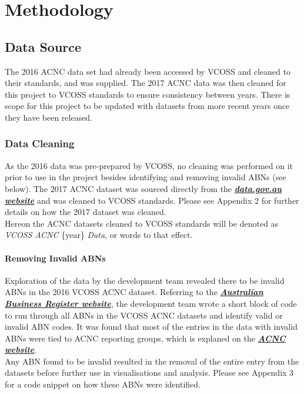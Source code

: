\documentclass[
  11pt,
]{article}
\begin{document}
\newpage

\hypertarget{methodology}{%
\section{Methodology}\label{methodology}}

\hypertarget{data-source}{%
\subsection{Data Source}\label{data-source}}

The 2016 ACNC data set had already been accessed by VCOSS and cleaned to their standards, and was supplied. The 2017 ACNC data was then cleaned for this project to VCOSS standards to ensure consistency between years. There is scope for this project to be updated with datasets from more recent years once they have been released.

\hypertarget{data-cleaning}{%
\subsubsection{Data Cleaning}\label{data-cleaning}}

As the 2016 data was pre-prepared by VCOSS, no cleaning was performed on it prior to use in the project besides identifying and removing invalid ABNs (see below). The 2017 ACNC dataset was sourced directly from the \href{https://data.gov.au/dataset/ds-dga-a1f8626c-fefb-4c4d-86ea-deaa04fb1f6e/details?q=}{\textbf{\emph{data.gov.au website}}} and was cleaned to VCOSS standards. Please see Appendix 2 for further details on how the 2017 dataset was cleaned.\\
Hereon the ACNC datasets cleaned to VCOSS standards will be denoted as \emph{VCOSS ACNC} \{year\} \emph{Data}, or words to that effect.

\hypertarget{removing-invalid-abns}{%
\paragraph{Removing Invalid ABNs}\label{removing-invalid-abns}}

Exploration of the data by the development team revealed there to be invalid ABNs in the 2016 VCOSS ACNC dataset. Referring to the \href{https://abr.business.gov.au/Help/AbnFormat}{\textbf{\emph{Australian Business Register website}}}, the development team wrote a short block of code to run through all ABNs in the VCOSS ACNC datasets and identify valid or invalid ABN codes. It was found that most of the entries in the data with invalid ABNs were tied to ACNC reporting groups, which is explaned on the \href{https://www.acnc.gov.au/for-charities/manage-your-charity/obligations-acnc/reporting-annually-acnc/group-reporting-and-bulk}{\textbf{\emph{ACNC website}}}.\\
Any ABN found to be invalid resulted in the removal of the entire entry from the datasets before further use in visualisations and analysis. Please see Appendix 3 for a code snippet on how these ABNs were identified.
\end{document}
